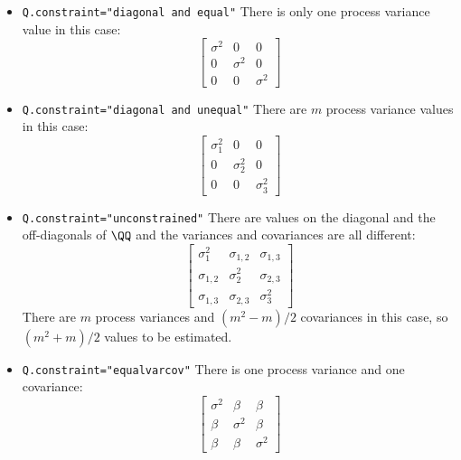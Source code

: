 \begin{itemize}\itemsep5pt
\item[] \texttt{Q.constraint="diagonal and equal"} There is only one process variance value in this case:
\begin{equation*}
 \left[ \begin{array}{ccc}
    \sigma^2 & 0 & 0\\
    0 & \sigma^2 & 0 \\
    0 & 0 & \sigma^2 \end{array} \right]
\end{equation*}

\item[] \texttt{Q.constraint="diagonal and unequal"}  There are $m$ process variance values in this case:  
\begin{equation*}
 \left[ \begin{array}{ccc}
    \sigma^2_1 & 0 & 0\\
    0 & \sigma^2_2 & 0 \\
    0 & 0 & \sigma^2_3 \end{array} \right]
\end{equation*}

\item[] \texttt{Q.constraint="unconstrained"} There are values on the diagonal and the off-diagonals of $\QQ$ and the variances and covariances are all different:  
\begin{equation*}
 \left[ \begin{array}{ccc}
    \sigma^2_1 & \sigma_{1,2} & \sigma_{1,3}\\
    \sigma_{1,2} & \sigma^2_2 & \sigma_{2,3} \\
    \sigma_{1,3} & \sigma_{2,3} & \sigma^2_3 \end{array} \right]
\end{equation*}
There are $m$ process variances and $(m^2-m)/2$ covariances in this case, so $(m^2+m)/2$ values to be estimated.
\item[] \texttt{Q.constraint="equalvarcov"} There is one process variance and one covariance:
\begin{equation*}
 \left[ \begin{array}{ccc}
    \sigma^2 & \beta & \beta\\
    \beta & \sigma^2 & \beta \\
    \beta & \beta & \sigma^2 \end{array} \right]
\end{equation*}
  

\end{itemize}
